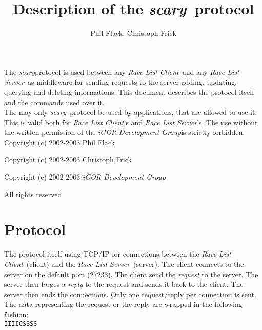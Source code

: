 \documentclass[a4paper,10pt]{article}
\newcommand{\scary}{{\it scary}}
\newcommand{\rls}{{\it Race List Server}}
\newcommand{\rlc}{{\it Race List Client}}
\newcommand{\gplopdev}{{\it iGOR Development Group}}
\newcommand{\scaryport}{27233}
\begin{document}
\title{Description of the \scary\ protocol}
\author{Phil Flack, Christoph Frick}

\maketitle

\vspace{2in}

\abstract

The \scary protocol is used between any \rlc\ and any \rls\ as middleware for
sending requests to the server adding, updating, querying and deleting
informations. This document describes the protocol itself and the commands
used over it.\\

The may only \scary\ protocol be used by applications, that are allowed to use
it. This is valid both for \rlc's and \rls's. The use without the written
permission of the \gplopdev is strictly forbidden.\\

Copyright (c) 2002-2003 Phil Flack
          
Copyright (c) 2002-2003 Christoph Frick
          
Copyright (c) 2002-2003 \gplopdev

All rights reserved

\newpage


\section{Protocol}

The protocol itself using TCP/IP for connections between the \rlc\ (client) and
the \rls\ (server). The client connects to the server on the default port
(\scaryport). The client send the {\it request} to the server. The server then
forges a {\it reply} to the request and sends it back to the client. The
server then ends the connections. Only one request/reply per connection is
sent.\\

The data representing the request or the reply are wrapped in the following
fashion:\\

{\tt IIIICSSSS}\\
\end{document}
